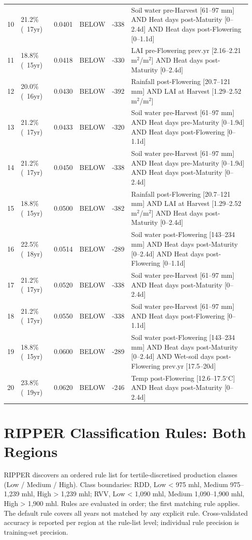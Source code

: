 {\begin{longtable}{p{0.4cm}|p{1.5cm}|p{1.2cm}|p{1.3cm}|p{1.5cm}|p{8.2cm}}
  10 & 21.2\% (~17yr) & 0.0401 & BELOW & -338 & Soil water pre-Harvest [61--97 mm] AND Heat days post-Maturity [0--2.4d] AND Heat days post-Flowering [0--1.1d] \\
  11 & 18.8\% (~15yr) & 0.0418 & BELOW & -330 & LAI pre-Flowering prev.yr [2.16--2.21 m$^2$/m$^2$] AND Heat days post-Maturity [0--2.4d] \\
  12 & 20.0\% (~16yr) & 0.0430 & BELOW & -392 & Rainfall post-Flowering [20.7--121 mm] AND LAI at Harvest [1.29--2.52 m$^2$/m$^2$] \\
  13 & 21.2\% (~17yr) & 0.0433 & BELOW & -320 & Soil water pre-Harvest [61--97 mm] AND Heat days pre-Maturity [0--1.9d] AND Heat days post-Flowering [0--1.1d] \\
  14 & 21.2\% (~17yr) & 0.0450 & BELOW & -338 & Soil water pre-Harvest [61--97 mm] AND Heat days pre-Maturity [0--1.9d] AND Heat days post-Maturity [0--2.4d] \\
  15 & 18.8\% (~15yr) & 0.0500 & BELOW & -382 & Rainfall post-Flowering [20.7--121 mm] AND LAI at Harvest [1.29--2.52 m$^2$/m$^2$] AND Heat days post-Maturity [0--2.4d] \\
  16 & 22.5\% (~18yr) & 0.0514 & BELOW & -289 & Soil water post-Flowering [143--234 mm] AND Heat days post-Maturity [0--2.4d] AND Heat days post-Flowering [0--1.1d] \\
  17 & 21.2\% (~17yr) & 0.0520 & BELOW & -338 & Soil water pre-Harvest [61--97 mm] AND Heat days post-Maturity [0--2.4d] \\
  18 & 21.2\% (~17yr) & 0.0550 & BELOW & -338 & Soil water pre-Harvest [61--97 mm] AND Heat days post-Flowering [0--1.1d] \\
  19 & 18.8\% (~15yr) & 0.0600 & BELOW & -289 & Soil water post-Flowering [143--234 mm] AND Heat days post-Maturity [0--2.4d] AND Wet-soil days post-Flowering prev.yr [17.5--20d] \\
  20 & 23.8\% (~19yr) & 0.0620 & BELOW & -246 & Temp post-Flowering [12.6--17.5$^\circ$C] AND Heat days post-Maturity [0--2.4d] \\
\end{longtable}
}



\section{RIPPER Classification Rules: Both Regions}\label{app_sec:ripper_classification_rules_both}

RIPPER discovers an ordered rule list for tertile-discretised production classes (Low / Medium / High). Class boundaries: RDD, Low < 975 mhl, Medium 975--1,239 mhl, High > 1,239 mhl; RVV, Low < 1,090 mhl, Medium 1,090--1,900 mhl, High > 1,900 mhl. Rules are evaluated in order; the first matching rule applies. The default rule covers all years not matched by any explicit rule. Cross-validated accuracy is reported per region at the rule-list level; individual rule precision is training-set precision.

